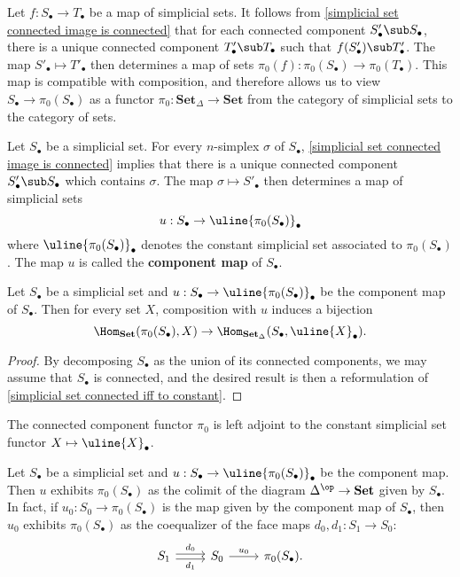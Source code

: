 \begin{remark}
Let $f:S_\bullet\to T_\bullet$ be a map of simplicial sets. It follows from \cref{simplicial set connected image is connected} that for each connected component $S'_\bullet\sub S_\bullet$, there is a unique connected component $T'_\bullet\sub T_\bullet$ such that $f(S'_\bullet)\sub T'_\bullet$. The map $S'_\bullet\mapsto T'_\bullet$ then determines a map of sets $\pi_0(f):\pi_0(S_\bullet)\to\pi_0(T_\bullet)$. This map is compatible
with composition, and therefore allows us to view $S_\bullet\to \pi_0(S_\bullet)$ as a functor $\pi_0:\mathbf{Set}_\Delta\to\mathbf{Set}$ from the category of simplicial sets to the category of sets.
\end{remark}
Let $S_\bullet$ be a simplicial set. For every $n$-simplex $\sigma$ of $S_\bullet$, \cref{simplicial set connected image is connected} implies that there is a unique connected component $S'_\bullet\sub S_\bullet$ which contains $\sigma$. The map $\sigma\mapsto S'_\bullet$ then determines a map of simplicial sets
\[u:S_\bullet\to\uline{\pi_0(S_\bullet)}_\bullet\]
where $\uline{\pi_0(S_\bullet)}_\bullet$ denotes the constant simplicial set associated to $\pi_0(S_\bullet)$. The map $u$ is called the \textbf{component map} of $S_\bullet$.
\begin{proposition}\label{simplicial set component map prop}
Let $S_\bullet$ be a simplicial set and $u:S_\bullet\to\uline{\pi_0(S_\bullet)}_\bullet$ be the component map of $S_\bullet$. Then for every set $X$, composition with $u$ induces a bijection
\[\Hom_{\mathbf{Set}}(\pi_0(S_\bullet),X)\to\Hom_{\mathbf{Set}_\Delta}(S_\bullet,\uline{X}_\bullet).\]
\end{proposition}
\begin{proof}
By decomposing $S_\bullet$ as the union of its connected components, we may assume that $S_\bullet$ is connected, and the desired result is then a reformulation of \cref{simplicial set connected iff to constant}.
\end{proof}
\begin{corollary}\label{simplicial set pi_0 is left adjoint to constant}
The connected component functor $\pi_0$ is left adjoint to the constant simplicial set functor $X\mapsto\uline{X}_\bullet$.
\end{corollary}
\begin{proposition}\label{simplicial set pi_0 is coequalizer of d_0 and d_1}
Let $S_\bullet$ be a simplicial set and $u:S_\bullet\to\uline{\pi_0(S_\bullet)}_\bullet$ be the component map. Then $u$ exhibits $\pi_0(S_\bullet)$ as the colimit of the diagram $\Delta^{\op}\to\mathbf{Set}$ given by $S_\bullet$. In fact, if $u_0:S_0\to \pi_0(S_\bullet)$ is the map given by the component map of $S_\bullet$, then $u_0$ exhibits $\pi_0(S_\bullet)$ as the coequalizer of the face maps $d_0,d_1:S_1\to S_0$:
\[\begin{tikzcd}
S_1\ar[r,shift left=2pt,"d_0"]\ar[r,shift right=2pt,swap,"d_1"]&S_0\ar[r,"u_0"]&\pi_0(S_\bullet).
\end{tikzcd}\]
\end{proposition}

